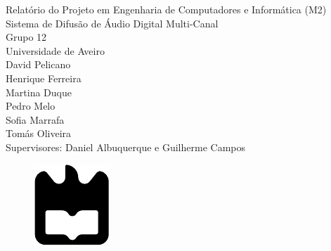 \documentclass{article}
\begin{document}
\def\titulo{Relatório do Projeto em Engenharia de Computadores e Informática (M2)}

\def\subtitulo{Sistema de Difusão de Áudio Digital Multi-Canal}
\def\data{DATA}
\def\autores{David Pelicano \\ Henrique Ferreira \\ Martina Duque \\ Pedro Melo \\ Sofia Marrafa \\ Tomás Oliveira }

\def\tutores{Daniel Albuquerque e Guilherme Campos}

\def\autorescontactos{(113391) davidpoetapelicano@ua.pt,\\  (113600) ferreira.manuel.henrique04@ua.pt,\\ (113261) martina.duque18@ua.pt \\ (114208) pedro.m.melo@ua.pt\\ (114591) sofiamarrafa@ua.pt\\ (113939) tomas.esteves.oliveira@ua.pt}

\def\departamento{Dept. de Eletrónica, Telecomunicações e Informática}
\def\empresa{Universidade de Aveiro}
\def\logotipo{ua.pdf}

%
%
\begin{titlepage}

\begin{center}
%
\vspace*{40mm}
%
{\Huge \titulo}\\ 

%

\vspace{10mm}
{\Large \subtitulo}\\ 
%
\vspace{4mm}
{\Large Grupo 12}\\ 
%
\vspace{10mm}
{\Large \empresa}\\
%
\vspace{15mm}
%
{\large \autores}\\ 
%
\vspace{15mm}
{\large Supervisores: Daniel Albuquerque e Guilherme Campos} \\
\vspace{20mm}
%
\begin{figure}[h]
\center
\includegraphics{ua.pdf}
\end{figure}
%
\vspace{25mm}
\end{center}
%
\begin{flushright}

\end{flushright}
\end{titlepage}
\end{document}
